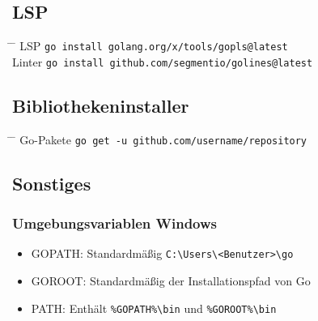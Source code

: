 \documentclass[twoside,a4paper,12pt]{article}
\begin{document}
\subsection{LSP}
\begin{tabbing}
  \hspace{2mm} \= \hspace{30mm} \= \kill
  \> LSP \>  \verb|go install golang.org/x/tools/gopls@latest| \\
  \> Linter \> \verb|go install github.com/segmentio/golines@latest| \\
\end{tabbing}
\subsection{Bibliothekeninstaller}
\begin{tabbing}
  \hspace{2mm} \= \hspace{30mm} \= \kill
  \> Go-Pakete \> \verb|go get -u github.com/username/repository|
 \end{tabbing}
\subsection{Sonstiges}
\subsubsection{Umgebungsvariablen Windows}
\begin{itemize}
  \item GOPATH: Standardmäßig \verb|C:\Users\<Benutzer>\go|
  \item GOROOT: Standardmäßig der Installationspfad von Go
  \item PATH: Enthält \verb|%GOPATH%\bin| und \verb|%GOROOT%\bin|
\end{itemize}
\end{document}
